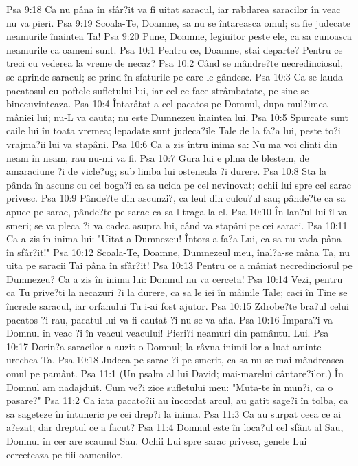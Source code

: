 Psa 9:18  Ca nu pâna în sfâr?it va fi uitat saracul, iar rabdarea saracilor în veac nu va pieri.
Psa 9:19  Scoala-Te, Doamne, sa nu se întareasca omul; sa fie judecate neamurile înaintea Ta!
Psa 9:20  Pune, Doamne, legiuitor peste ele, ca sa cunoasca neamurile ca oameni sunt.
Psa 10:1  Pentru ce, Doamne, stai departe? Pentru ce treci cu vederea la vreme de necaz?
Psa 10:2  Când se mândre?te necredinciosul, se aprinde saracul; se prind în sfaturile pe care le gândesc.
Psa 10:3  Ca se lauda pacatosul cu poftele sufletului lui, iar cel ce face strâmbatate, pe sine se binecuvinteaza.
Psa 10:4  Întarâtat-a cel pacatos pe Domnul, dupa mul?imea mâniei lui; nu-L va cauta; nu este Dumnezeu înaintea lui.
Psa 10:5  Spurcate sunt caile lui în toata vremea; lepadate sunt judeca?ile Tale de la fa?a lui, peste to?i vrajma?ii lui va stapâni.
Psa 10:6  Ca a zis întru inima sa: Nu ma voi clinti din neam în neam, rau nu-mi va fi.
Psa 10:7  Gura lui e plina de blestem, de amaraciune ?i de vicle?ug; sub limba lui osteneala ?i durere.
Psa 10:8  Sta la pânda în ascuns cu cei boga?i ca sa ucida pe cel nevinovat; ochii lui spre cel sarac privesc.
Psa 10:9  Pânde?te din ascunzi?, ca leul din culcu?ul sau; pânde?te ca sa apuce pe sarac, pânde?te pe sarac ca sa-l traga la el.
Psa 10:10  În lan?ul lui îl va smeri; se va pleca ?i va cadea asupra lui, când va stapâni pe cei saraci.
Psa 10:11  Ca a zis în inima lui: "Uitat-a Dumnezeu! Întors-a fa?a Lui, ca sa nu vada pâna în sfâr?it!"
Psa 10:12  Scoala-Te, Doamne, Dumnezeul meu, înal?a-se mâna Ta, nu uita pe saracii Tai pâna în sfâr?it!
Psa 10:13  Pentru ce a mâniat necredinciosul pe Dumnezeu? Ca a zis în inima lui: Domnul nu va cerceta!
Psa 10:14  Vezi, pentru ca Tu prive?ti la necazuri ?i la durere, ca sa le iei în mâinile Tale; caci în Tine se încrede saracul, iar orfanului Tu i-ai fost ajutor.
Psa 10:15  Zdrobe?te bra?ul celui pacatos ?i rau, pacatul lui va fi cautat ?i nu se va afla.
Psa 10:16  Împara?i-va Domnul în veac ?i în veacul veacului! Pieri?i neamuri din pamântul Lui.
Psa 10:17  Dorin?a saracilor a auzit-o Domnul; la râvna inimii lor a luat aminte urechea Ta.
Psa 10:18  Judeca pe sarac ?i pe smerit, ca sa nu se mai mândreasca omul pe pamânt.
Psa 11:1  (Un psalm al lui David; mai-marelui cântare?ilor.) În Domnul am nadajduit. Cum ve?i zice sufletului meu: "Muta-te în mun?i, ca o pasare?"
Psa 11:2  Ca iata pacato?ii au încordat arcul, au gatit sage?i în tolba, ca sa sageteze în întuneric pe cei drep?i la inima.
Psa 11:3  Ca au surpat ceea ce ai a?ezat; dar dreptul ce a facut?
Psa 11:4  Domnul este în loca?ul cel sfânt al Sau, Domnul în cer are scaunul Sau. Ochii Lui spre sarac privesc, genele Lui cerceteaza pe fiii oamenilor.
